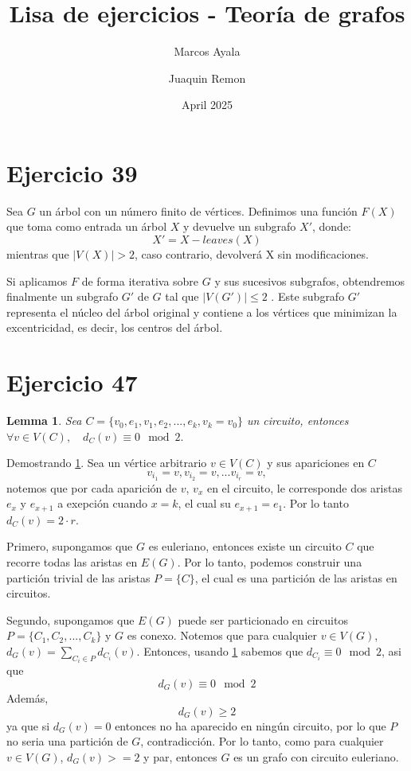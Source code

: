 \documentclass{article}
\title{Lisa de ejercicios - Teoría de grafos}
\author{
	Marcos Ayala \\ 
	\and Juaquin Remon
}
\date{April 2025}
\newtheorem{lemma}[theorem]{Lemma}
\begin{document}
	
	\maketitle
	
	\section{Ejercicio 39}
	
	
	
	Sea $G$ un árbol con un número finito de vértices. Definimos una función $F(X)$ que toma como entrada un árbol 
	$X$ y devuelve un subgrafo $X'$, donde:
	$$X' = X-leaves(X)$$
	mientras que $|V(X)| > 2$, caso contrario, devolverá X sin modificaciones. 
	
	Si aplicamos $F$ de forma iterativa sobre $G$ y sus sucesivos subgrafos, obtendremos finalmente un subgrafo $G'$ de $G$ tal que $|V(G')| \leq 2$ . Este subgrafo $G'$ representa el núcleo del árbol original y contiene a los vértices que minimizan la excentricidad, es decir, los centros del árbol.
	
	\section{Ejercicio 47}
	\begin{lemma}\label{circuito}
		Sea $C = \{v_0, e_1, v_1, e_2, ..., e_k, v_k = v_0\}$ un circuito, entonces
		$\forall v \in V(C), \quad d_C(v) \equiv 0 \mod 2. $
	\end{lemma}
	Demostrando \ref{circuito}. Sea un vértice arbitrario $v \in V(C)$ y sus apariciones en $C$
	$$v_{i_1} = v, v_{i_2} = v, ... v_{i_r} = v,$$  
	notemos que por cada aparición de $v$, $v_x$ en el circuito, le corresponde dos aristas $e_x$ y $e_{x+1}$ a exepción cuando $x = k$, el cual su $e_{x+1} = e_1$. Por lo tanto $d_C(v) = 2 \cdot r$.
	
	Primero, supongamos que $G$ es euleriano, entonces existe un circuito $C$ que recorre todas las aristas en $E(G)$. Por lo tanto, podemos construir una partición trivial de las aristas $P = \{C\}$, el cual es una partición de las aristas en circuitos.
	
	Segundo, supongamos que $E(G)$ puede ser particionado en circuitos $P = \{C_1, C_2,..., C_k\}$ y $G$ es conexo. Notemos que para cualquier $v \in V(G)$, $d_G(v) = \sum_{C_i \in P} d_{C_i}(v)$. Entonces, usando \ref{circuito} sabemos que $d_{C_i} \equiv 0 \mod 2$, asi que 
	$$d_G(v) \equiv 0 \mod 2$$
	Además, 
	$$d_G(v) \geq 2$$
	ya que si $d_G(v) = 0$ entonces no ha aparecido en ningún circuito, por lo que $P$ no seria una partición de $G$, contradicción.
	Por lo tanto, como para cualquier $v \in V(G)$, $d_G(v) >= 2$ y par, entonces $G$ es un grafo con circuito euleriano.
	
\end{document}

